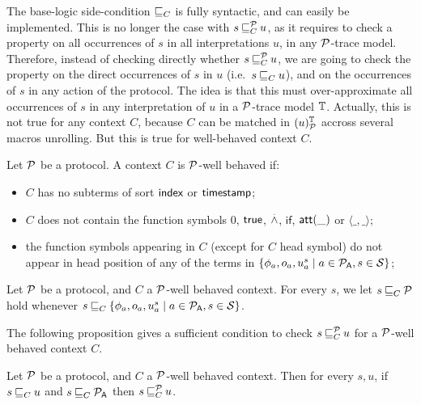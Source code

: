 The base-logic side-condition $\mathbin{\sqsubseteq}_{C}$ is fully syntactic, and can easily be implemented. This is no longer the case with $s \mathbin{\sqsubseteq}^{\mathcal{P}}_{C} u$, as it requires to check a property on all occurrences of $s$ in all interpretations $u$, in any $\mathcal{P}$-trace model. Therefore, instead of checking directly whether $s \mathbin{\sqsubseteq}^{\mathcal{P}}_{C} u$, we are going to check the property on the direct occurrences of $s$ in $u$ (i.e.\ $s \mathbin{\sqsubseteq}_{C} u$), and on the occurrences of $s$ in any action of the protocol. The idea is that this must over-approximate all occurrences of $s$ in any interpretation of $u$ in a $\mathcal{P}$-trace model $\mathbb{T}$. Actually, this is not true for any context $C$, because $C$ can be matched in $(u)^{\mathbb{T}}_{\mathcal{P}}$ accross several macros unrolling. But this is true for well-behaved context $C$. 

\begin{definition}
  Let $\mathcal{P}$ be a protocol. A context $C$ is $\mathcal{P}$-well behaved if:
  \begin{itemize}
  \item $C$ has no subterms of sort $\textsf{index}$ or $\textsf{timestamp}$;
  \item $C$ does not contain the function symbols $0$, $\textsf{true}$, $\stackrel{.}{\wedge}$, $\mathsf{if}$, $\mathsf{att}(\_)$ or $\langle \_,\_\rangle$;
  \item the function symbols appearing in $C$ (except for $C$ head symbol) do not appear in head position of any of the terms in $\{\phi_a,o_a,u^s_a \mid a \in \mathcal{P}_{\textsf{A}}, s \in\mathcal{S}\}$;
  \end{itemize}
\end{definition}


\begin{definition}
  Let $\mathcal{P}$ be a protocol, and $C$ a $\mathcal{P}$-well behaved context. For every $s$, we let $s \mathbin{\sqsubseteq}_{C} \mathcal{P}$ hold whenever $s \mathbin{\sqsubseteq}_{C} \{\phi_a,o_a,u^s_a \mid a \in \mathcal{P}_{\textsf{A}}, s \in\mathcal{S}\}$.
\end{definition}

The following proposition gives a sufficient condition to check $s \mathbin{\sqsubseteq}^{\mathcal{P}}_{C} u$ for a $\mathcal{P}$-well behaved context $C$.

\begin{proposition}
  Let $\mathcal{P}$ be a protocol, and $C$ a $\mathcal{P}$-well behaved context. Then for every $s,u$, if $s \mathbin{\sqsubseteq}_{C} u$ and $s \mathbin{\sqsubseteq}_{C} \mathcal{P}_{\textsf{A}}$ then $s \mathbin{\sqsubseteq}^{\mathcal{P}}_{C} u$.
\end{proposition}

